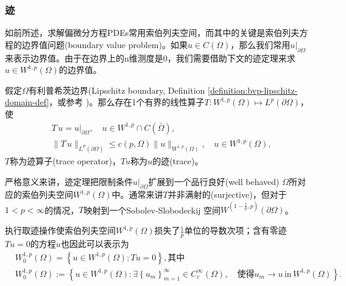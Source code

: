 \subsubsection{迹}
如前所述，求解偏微分方程PDEs常用索伯列夫空间，而其中的关键是索伯列夫方程的边界值问题(boundary value problem)。如果$u \in C(\Omega)$，那么我们常用$u \big|_{\partial \Omega}$来表示边界值。由于在边界上的n维测度是$0$，我们需要借助下文的迹定理来求$u \in W^{k,p}(\Omega)$的边界值。

\begin{theorem}[迹定理]
  \label{theorem:sobolev-trace-theorem}
假定$\Omega$有利普希茨边界(Lipschitz boundary, Definition \ref{definition:bvp-lipschitz-domain-def}，或参考 \cite{Heinonen:2005wq})。那么存在1个有界的线性算子$T: W^{1,p}(\Omega) \mapsto L^p(\partial \Omega)$，使
\begin{equation*}
  \begin{split}
    &T \, u = u \big|_{\partial \Omega}, \quad u \in W^{1,p} \cap C(\bar{\Omega}), \\
    &\Big\| T \, u \Big\|_{L^P(\partial \Omega)} \le c(p,\Omega) \Big\| u \Big\|_{W^{1,p}(\Omega)}, \quad u \in W^{1,p}(\Omega),
  \end{split}
\end{equation*}
$T$称为迹算子(trace operator)，$Tu$称为$u$的迹(trace)。
\end{theorem}

严格意义来讲，迹定理把限制条件$u \big|_{\partial \Omega}$扩展到一个品行良好(well behaved) $\Omega$所对应的索伯列夫空间$W^{1,p}(\Omega)$中。通常来讲$T$并非满射的(surjective)，但对于$1 < p < \infty$的情况，$T$映射到一个Sobolev-Slobodeckij 空间$W^{\left( 1 - \frac{1}{p}, p \right)}\left( \partial \Omega \right)$。

执行取迹操作使索伯列夫空间$W^{1,p}(\Omega)$损失了$\frac{1}{p}$单位的导数次项；含有零迹$Tu=0$的方程$u$也因此可以表示为
\begin{equation*}
  \begin{split}
    &W_0^{1,p} (\Omega) = \left\{ u \in W^{1,p} (\Omega): Tu = 0\right\}, \text{其中}\\
    &W_0^{1,p}(\Omega) :=
    \left\{
    u \in W^{1,p}(\Omega): \exists \left\{ u_m \right\}_{m=1}^{\infty} \in C_c^{\infty}(\Omega), \quad \text{使得} u_m \rightarrow u \, \text{in} \, W^{1,p}(\Omega)
    \right\}.
  \end{split}
\end{equation*}


